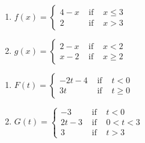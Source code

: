 \documentclass{ximera}
\begin{document}
\begin{multicols}{2}
\begin{enumerate}
\setcounter{enumi}{\value{HW}}

\item ${\displaystyle f(x) = \left\{ \begin{array}{rcl} 4-x & \mbox{ if } &  x \leq 3 \\
                                                            2 & \mbox{ if } & x > 3
                                     \end{array} \right. }$   \label{graphpwiseexerfirst}

\item ${\displaystyle g(x) = \left\{ \begin{array}{rcl} 2-x & \mbox{ if } &  x < 2 \\
                                                            x-2 & \mbox{ if } & x \geq  2
                                     \end{array} \right. }$


\setcounter{HW}{\value{enumi}}
\end{enumerate}
\end{multicols}


\begin{multicols}{2}
\begin{enumerate}
\setcounter{enumi}{\value{HW}}

\item ${\displaystyle F(t) = \left\{ \begin{array}{rcl} -2t - 4 & \mbox{ if } &  t < 0 \\
                                                             3t & \mbox{ if } & t \geq 0
                                     \end{array} \right. }$


\item ${\displaystyle G(t) = \left\{ \begin{array}{rcl}  -3 & \mbox{ if } & t < 0 \\
                                                        2t-3 & \mbox{ if } & 0 < t < 3 \\
                                                            3 & \mbox{ if } & t > 3
                                     \end{array} \right. }$  \label{graphpwiseexerlast}



 \label{graphlineexerlast}

\setcounter{HW}{\value{enumi}}
\end{enumerate}
\end{multicols}
\end{document}
